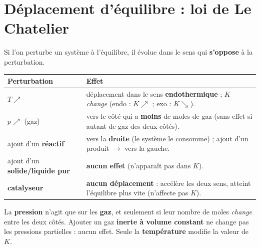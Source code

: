 \documentclass[11pt,a4paper]{article}
\begin{document}
\section{Déplacement d'équilibre : loi de Le Chatelier}

\begin{theoremeb}
Si l'on perturbe un système à l'équilibre, il évolue dans le sens qui \textbf{s'oppose} à la perturbation.
\end{theoremeb}

\renewcommand{\arraystretch}{1.25}
\begin{center}\small
\begin{tabular}{@{}>{\raggedright\arraybackslash}m{4.6cm}>{\raggedright\arraybackslash}m{11.3cm}@{}}
\toprule
\textbf{Perturbation} & \textbf{Effet} \\
\midrule
\rowcolor{primary!6} $T \nearrow$ & déplacement dans le sens \textbf{endothermique} ; \emph{$K$ change} (endo : $K\nearrow$ ; exo : $K\searrow$). \\
$p \nearrow$ (gaz) & vers le côté qui a \textbf{moins} de moles de gaz (sans effet si autant de gaz des deux côtés). \\
\rowcolor{primary!6} ajout d'un \textbf{réactif} & vers la \textbf{droite} (le système le consomme) ; ajout d'un produit $\to$ vers la gauche. \\
ajout d'un \textbf{solide/liquide pur} & \textbf{aucun effet} (n'apparaît pas dans $K$). \\
\rowcolor{primary!6} \textbf{catalyseur} & \textbf{aucun déplacement} : accélère les deux sens, atteint l'équilibre plus vite (n'affecte pas $K$). \\
\bottomrule
\end{tabular}
\end{center}
\renewcommand{\arraystretch}{1.0}

\begin{attentionb}
La \textbf{pression} n'agit que sur les \textbf{gaz}, et seulement si leur nombre de moles \emph{change}
entre les deux côtés. Ajouter un gaz \textbf{inerte à volume constant} ne change pas les pressions
partielles : aucun effet. Seule la \textbf{température} modifie la valeur de $K$.
\end{attentionb}
\end{document}
